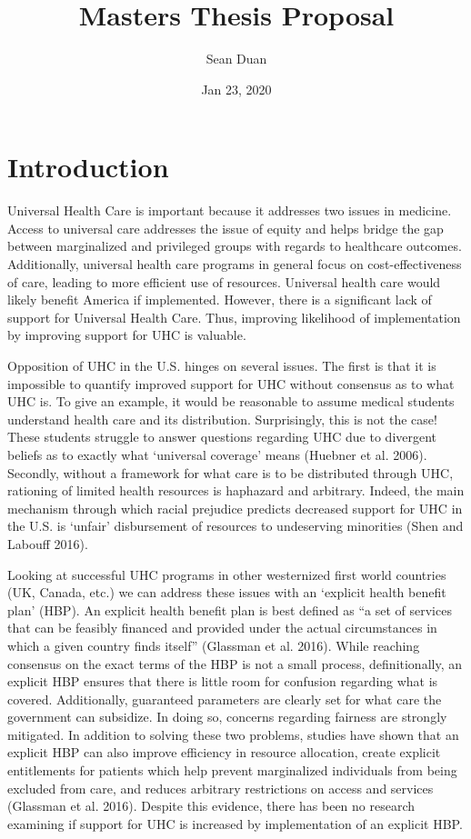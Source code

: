 \documentclass[
]{article}
\title{Masters Thesis Proposal}
\author{Sean Duan}
\date{Jan 23, 2020}
\begin{document}
\maketitle

\hypertarget{introduction}{%
\section{Introduction}\label{introduction}}

Universal Health Care is important because it addresses two issues in
medicine. Access to universal care addresses the issue of equity and
helps bridge the gap between marginalized and privileged groups with
regards to healthcare outcomes. Additionally, universal health care
programs in general focus on cost-effectiveness of care, leading to more
efficient use of resources. Universal health care would likely benefit
America if implemented. However, there is a significant lack of support
for Universal Health Care. Thus, improving likelihood of implementation
by improving support for UHC is valuable.

Opposition of UHC in the U.S. hinges on several issues. The first is
that it is impossible to quantify improved support for UHC without
consensus as to what UHC is. To give an example, it would be reasonable
to assume medical students understand health care and its distribution.
Surprisingly, this is not the case! These students struggle to answer
questions regarding UHC due to divergent beliefs as to exactly what
`universal coverage' means (Huebner et al. 2006). Secondly, without a
framework for what care is to be distributed through UHC, rationing of
limited health resources is haphazard and arbitrary. Indeed, the main
mechanism through which racial prejudice predicts decreased support for
UHC in the U.S. is `unfair' disbursement of resources to undeserving
minorities (Shen and Labouff 2016).

Looking at successful UHC programs in other westernized first world
countries (UK, Canada, etc.) we can address these issues with an
`explicit health benefit plan' (HBP). An explicit health benefit plan is
best defined as ``a set of services that can be feasibly financed and
provided under the actual circumstances in which a given country finds
itself'' (Glassman et al. 2016). While reaching consensus on the exact
terms of the HBP is not a small process, definitionally, an explicit HBP
ensures that there is little room for confusion regarding what is
covered. Additionally, guaranteed parameters are clearly set for what
care the government can subsidize. In doing so, concerns regarding
fairness are strongly mitigated. In addition to solving these two
problems, studies have shown that an explicit HBP can also improve
efficiency in resource allocation, create explicit entitlements for
patients which help prevent marginalized individuals from being excluded
from care, and reduces arbitrary restrictions on access and services
(Glassman et al. 2016). Despite this evidence, there has been no
research examining if support for UHC is increased by implementation of
an explicit HBP.
\end{document}
